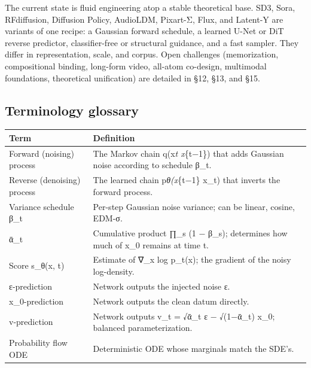 The current state is fluid engineering atop a stable theoretical base. SD3, Sora, RFdiffusion, Diffusion Policy, AudioLDM, Pixart-Σ, Flux, and Latent-Y are variants of one recipe: a Gaussian forward schedule, a learned U-Net or DiT reverse predictor, classifier-free or structural guidance, and a fast sampler. They differ in representation, scale, and corpus. Open challenges (memorization, compositional binding, long-form video, all-atom co-design, multimodal foundations, theoretical unification) are detailed in §12, §13, and §15.

\subsection{Terminology glossary}\label{terminology-glossary}

{\def\LTcaptype{none} %
\begin{longtable}[]{@{}
  >{\raggedright\arraybackslash}p{}
  >{\raggedright\arraybackslash}p{}@{}}
\toprule\noalign{}
\begin{minipage}[b]{\linewidth}\raggedright
Term
\end{minipage} & \begin{minipage}[b]{\linewidth}\raggedright
Definition
\end{minipage} \\
\midrule\noalign{}
\endhead
\bottomrule\noalign{}
\endlastfoot
Forward (noising) process & The Markov chain q(x\emph{t \textbar{} x}\{t−1\}) that adds Gaussian noise according to schedule β\_t. \\
Reverse (denoising) process & The learned chain p\emph{θ(x}\{t−1\} \textbar{} x\_t) that inverts the forward process. \\
Variance schedule β\_t & Per-step Gaussian noise variance; can be linear, cosine, EDM-σ. \\
ᾱ\_t & Cumulative product ∏\_s (1 − β\_s); determines how much of x\_0 remains at time t. \\
Score s\_θ(x, t) & Estimate of ∇\_x log p\_t(x); the gradient of the noisy log-density. \\
ε-prediction & Network outputs the injected noise ε. \\
x\_0-prediction & Network outputs the clean datum directly. \\
v-prediction & Network outputs v\_t = √ᾱ\_t ε − √(1−ᾱ\_t) x\_0; balanced parameterization. \\
Probability flow ODE & Deterministic ODE whose marginals match the SDE's. \\

\end{longtable}}
